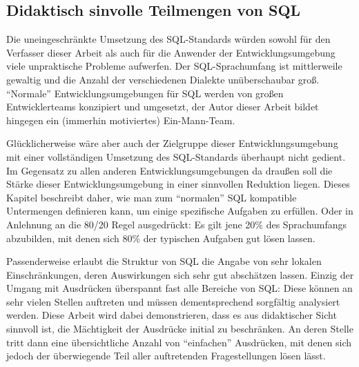 \subsection{Didaktisch sinvolle Teilmengen von SQL}
\label{sec:sql-subset}


Die uneingeschränkte Umsetzung des SQL-Standards würden sowohl für den Verfasser dieser Arbeit als auch für die Anwender der Entwicklungsumgebung viele unpraktische Probleme aufwerfen. Der SQL-Sprachumfang ist mittlerweile gewaltig und die Anzahl der verschiedenen Dialekte unüberschaubar groß. ``Normale'' Entwicklungsumgebungen für SQL werden von großen Entwicklerteams konzipiert und umgesetzt, der Autor dieser Arbeit bildet hingegen ein (immerhin motiviertes) Ein-Mann-Team.

Glücklicherweise wäre aber auch der Zielgruppe dieser Entwicklungsumgebung mit einer vollständigen Umsetzung des SQL-Standards überhaupt nicht gedient. Im Gegensatz zu allen anderen Entwicklungsumgebungen da draußen soll die Stärke dieser Entwicklungsumgebung in einer sinnvollen Reduktion liegen. Dieses Kapitel beschreibt daher, wie man zum ``normalen'' SQL kompatible Untermengen definieren kann, um einige spezifische Aufgaben zu erfüllen. Oder in Anlehnung an die 80/20 Regel ausgedrückt: Es gilt jene 20\% des Sprachumfangs abzubilden, mit denen sich 80\% der typischen Aufgaben gut lösen lassen.

Passenderweise erlaubt die Struktur von SQL die Angabe von sehr lokalen Einschränkungen, deren Auswirkungen sich sehr gut abschätzen lassen. Einzig der Umgang mit Ausdrücken überspannt fast alle Bereiche von SQL: Diese können an sehr vielen Stellen auftreten und müssen dementsprechend sorgfältig analysiert werden. Diese Arbeit wird dabei demonstrieren, dass es aus didaktischer Sicht sinnvoll ist, die Mächtigkeit der Ausdrücke initial zu beschränken. An deren Stelle tritt dann eine übersichtliche Anzahl von ``einfachen'' Ausdrücken, mit denen sich jedoch der überwiegende Teil aller auftretenden Fragestellungen lösen lässt.


